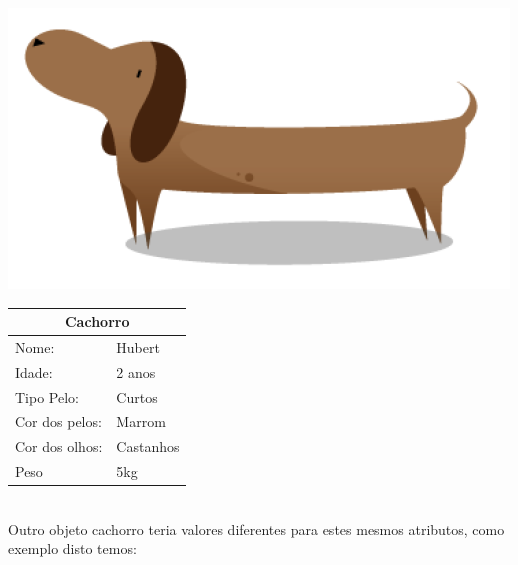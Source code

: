 \begin{minipage}{\textwidth}
  \begin{minipage}[b]{0.49\textwidth}
    \centering
    \includegraphics[scale=0.4]{imagens/cachorro-objeto.png}
    \label{fig:cachorro-objeto-1}
  \end{minipage}
  \hfill
  \begin{minipage}[b]{0.52\textwidth}
    \centering
    \begin{tabular}{|l|l|}
      \hline
      \multicolumn{2}{|c|}{Cachorro}      \\ \hline
        Nome:                 & Hubert    \\ \hline
        Idade:                & 2 anos    \\ \hline
        Tipo Pelo:            & Curtos    \\ \hline
        Cor dos pelos:        & Marrom    \\ \hline
        Cor dos olhos:        & Castanhos \\ \hline
        Peso                  & 5kg       \\ \hline
      \end{tabular}
    \end{minipage}
  \end{minipage} \\

  Outro objeto cachorro teria valores diferentes para estes mesmos 
  atributos, como exemplo disto temos:

